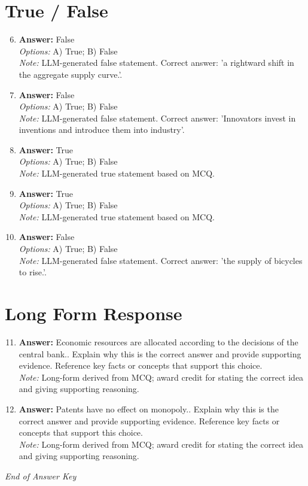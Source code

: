 \documentclass[12pt]{article}
\begin{document}
\section*{True / False}
\begin{enumerate}[label=\arabic*.]
\setcounter{enumi}{5}
\item \textbf{Answer:} False
\\ \textit{Options:} A) True; B) False
\\ \textit{Note:} LLM-generated false statement. Correct answer: 'a rightward shift in the aggregate supply curve.'.
\item \textbf{Answer:} False
\\ \textit{Options:} A) True; B) False
\\ \textit{Note:} LLM-generated false statement. Correct answer: 'Innovators invest in inventions and introduce them into industry'.
\item \textbf{Answer:} True
\\ \textit{Options:} A) True; B) False
\\ \textit{Note:} LLM-generated true statement based on MCQ.
\item \textbf{Answer:} True
\\ \textit{Options:} A) True; B) False
\\ \textit{Note:} LLM-generated true statement based on MCQ.
\item \textbf{Answer:} False
\\ \textit{Options:} A) True; B) False
\\ \textit{Note:} LLM-generated false statement. Correct answer: 'the supply of bicycles to rise.'.
\end{enumerate}

\section*{Long Form Response}
\begin{enumerate}[label=\arabic*.]
\setcounter{enumi}{10}
\item \textbf{Answer:} Economic resources are allocated according to the decisions of the central bank.. Explain why this is the correct answer and provide supporting evidence. Reference key facts or concepts that support this choice.
\\ \textit{Note:} Long-form derived from MCQ; award credit for stating the correct idea and giving supporting reasoning.
\item \textbf{Answer:} Patents have no effect on monopoly.. Explain why this is the correct answer and provide supporting evidence. Reference key facts or concepts that support this choice.
\\ \textit{Note:} Long-form derived from MCQ; award credit for stating the correct idea and giving supporting reasoning.
\end{enumerate}

\vfill
\noindent\textit{End of Answer Key}
\end{document}
